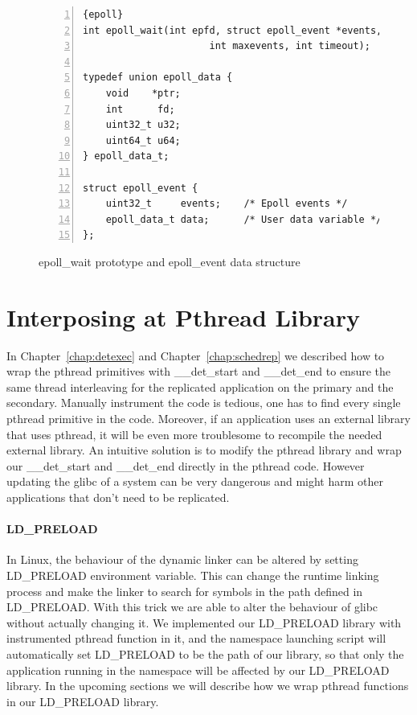 \begin{figure}
\begin{lstlisting}[numbers=left, frame=single, basicstyle=\small, breaklines]{epoll}
int epoll_wait(int epfd, struct epoll_event *events,
                      int maxevents, int timeout);

typedef union epoll_data {
    void    *ptr;
    int      fd;
    uint32_t u32;
    uint64_t u64;
} epoll_data_t;

struct epoll_event {
    uint32_t     events;    /* Epoll events */
    epoll_data_t data;      /* User data variable */
};

\end{lstlisting}
\caption{epoll\_wait prototype and epoll\_event data structure}
\label{f:epoll}
\end{figure}

\section{Interposing at Pthread Library} \label{chap:library}
In Chapter~\ref{chap:detexec} and Chapter~\ref{chap:schedrep} we described how to wrap the pthread primitives with \_\_det\_start and \_\_det\_end to ensure the same thread interleaving for the replicated application on the primary and the secondary. Manually instrument the code is tedious, one has to find every single pthread primitive in the code. Moreover, if an application uses an external library that uses pthread, it will be even more troublesome to recompile the needed external library. An intuitive solution is to modify the pthread library and wrap our \_\_det\_start and \_\_det\_end directly in the pthread code. However updating the glibc of a system can be very dangerous and might harm other applications that don't need to be replicated.

\paragraph{LD\_PRELOAD}
In Linux, the behaviour of the dynamic linker can be altered by setting LD\_PRELOAD environment variable. This can change the runtime linking process and make the linker to search for symbols in the path defined in LD\_PRELOAD. With this trick we are able to alter the behaviour of glibc without actually changing it. We implemented our LD\_PRELOAD library with instrumented pthread function in it, and the namespace launching script will automatically set LD\_PRELOAD to be the path of our library, so that only the application running in the namespace will be affected by our LD\_PRELOAD library. In the upcoming sections we will describe how we wrap pthread functions in our LD\_PRELOAD library.

